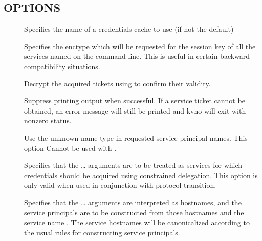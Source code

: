 \documentclass[letterpaper,10pt,english]{sphinxmanual}
\begin{document}
\subsection{OPTIONS}
\label{\detokenize{user/user_commands/kvno:options}}\begin{description}
\item[{ }] \leavevmode
\sphinxAtStartPar
Specifies the name of a credentials cache to use (if not the
default)

\item[{ }] \leavevmode
\sphinxAtStartPar
Specifies the enctype which will be requested for the session key
of all the services named on the command line.  This is useful in
certain backward compatibility situations.

\item[{ }] \leavevmode
\sphinxAtStartPar
Decrypt the acquired tickets using  to confirm their
validity.

\item[{}] \leavevmode
\sphinxAtStartPar
Suppress printing output when successful.  If a service ticket
cannot be obtained, an error message will still be printed and
kvno will exit with nonzero status.

\item[{}] \leavevmode
\sphinxAtStartPar
Use the unknown name type in requested service principal names.
This option Cannot be used with .

\item[{}] \leavevmode
\sphinxAtStartPar
Specifies that the  …  arguments are to be
treated as services for which credentials should be acquired using
constrained delegation.  This option is only valid when used in
conjunction with protocol transition.

\item[{ }] \leavevmode
\sphinxAtStartPar
Specifies that the  … arguments are
interpreted as hostnames, and the service principals are to be
constructed from those hostnames and the service name .
The service hostnames will be canonicalized according to the usual
rules for constructing service principals.


\end{description}
\end{document}
